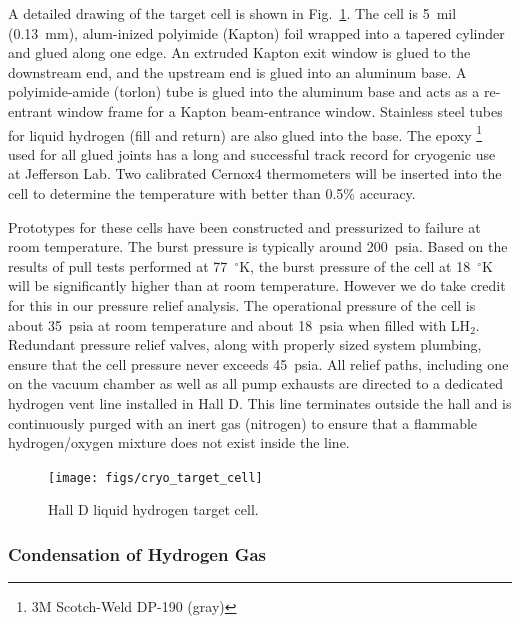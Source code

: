 A detailed drawing of the target cell is shown in
Fig.~\ref{fig:tgt:cell}.  The cell is 5~mil (0.13~mm), alum-inized
polyimide (Kapton) foil wrapped into a tapered cylinder and glued
along one edge.  An extruded Kapton exit window is glued to the
downstream end, and the upstream end is glued into an aluminum base.
A polyimide-amide (torlon) tube is glued into the aluminum base and
acts as a re-entrant window frame for a Kapton beam-entrance window.
Stainless steel tubes for liquid hydrogen (fill and return) are also
glued into the base.  The epoxy%
\footnote{3M Scotch-Weld DP-190 (gray)}
used for all
glued joints has a long and successful track record for cryogenic use
at Jefferson Lab.  Two calibrated Cernox4 thermometers will be
inserted into the cell to determine the temperature with better than
0.5\% accuracy.

Prototypes for these cells have been constructed and pressurized to
failure at room temperature.  The burst pressure is typically around
200~psia. Based on the results of pull tests performed at 77~$^\circ$K, the
burst pressure of the cell at 18~$^\circ$K will be significantly higher than
at room temperature.  However we do take credit for this in our
pressure relief analysis.  The operational pressure of the cell is
about 35~psia at room temperature and about 18~psia when filled with
LH$_2$. Redundant pressure relief valves, along with properly sized
system plumbing, ensure that the cell pressure never exceeds 45~psia.
All relief paths, including one on the vacuum chamber as well as all
pump exhausts are directed to a dedicated hydrogen vent line installed
in Hall D.  This line terminates outside the hall and is continuously
purged with an inert gas (nitrogen) to ensure that a flammable
hydrogen/oxygen mixture does not exist inside the line.


\begin{figure}[h]
\begin{center}
      \texttt{[image: figs/cryo\_target\_cell]}
\end{center}
\caption{
Hall D liquid hydrogen target cell.
\label{fig:tgt:cell}}
\end{figure}

 
\subsubsection[Condensation of Hydrogen Gas]{Condensation of Hydrogen Gas 
\label{sec:tgt:condens}}

